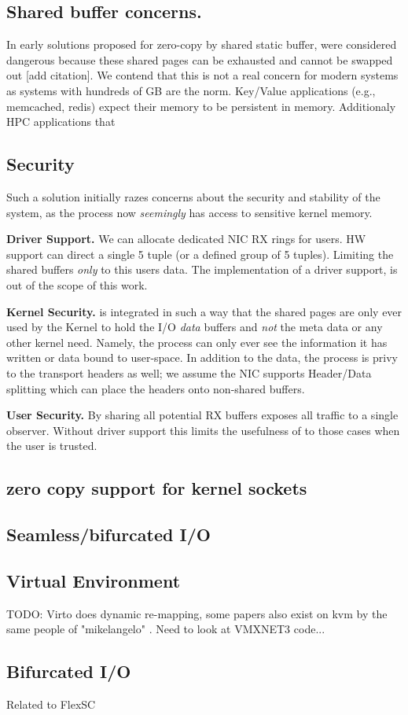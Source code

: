 \subsection{Shared buffer concerns.}
In early solutions proposed for zero-copy by shared static buffer, were considered dangerous because these shared pages can be exhausted and cannot be swapped out [add citation]. We contend that this is not a real concern for modern systems as systems with hundreds of GB are the norm. Key/Value applications (e.g., memcached, redis) expect their memory to be persistent in memory. Additionaly HPC applications that 

\subsection{Security}
Such a solution initially razes concerns about the security and stability of the system, as the process now \emph{seemingly} has access to sensitive kernel memory. 

\noindent\textbf{Driver Support.} We can allocate dedicated NIC RX rings for \oursys users. HW support\cite{flow_direct} can direct a single 5 tuple (or a defined group of 5 tuples). Limiting the shared buffers \emph{only} to this users data. The implementation of a driver support, is out of the scope of this work. 

\noindent\textbf{Kernel Security.} \oursys is integrated in such a way that the shared pages are only ever used by the Kernel to hold the I/O \emph{data} buffers and \emph{not} the meta data or any other kernel need. Namely, the process can only ever see the information it has written or data bound to user-space. In addition to the data, the process is privy to the transport headers as well; we assume the NIC supports Header/Data splitting\cite{hds} which can place the headers onto non-shared buffers.

\noindent\textbf{User Security.} By sharing all potential RX buffers \oursys exposes all traffic to a single observer.
Without driver support this limits the usefulness of \oursys to those cases when the user is trusted. 

\subsection{zero copy support for kernel sockets}
\subsection{Seamless/bifurcated I/O}
\subsection{Virtual Environment}
TODO: Virto does dynamic re-mapping, some papers also exist on kvm by the same people of "mikelangelo" \cite{mikelangelo}. Need to look at VMXNET3 code...
\subsection{Bifurcated I/O}
Related to FlexSC \cite{flexsc}